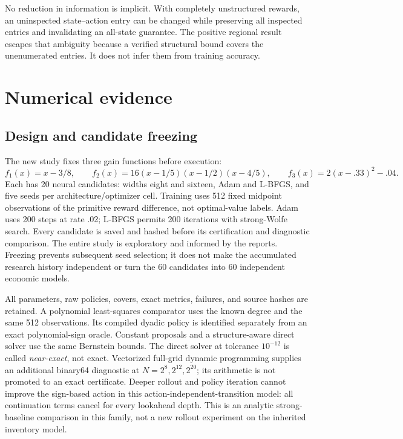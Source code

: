 No reduction in information is implicit. With completely unstructured rewards, an uninspected state--action entry can be changed while preserving all inspected entries and invalidating an all-state guarantee. The positive regional result escapes that ambiguity because a verified structural bound covers the unenumerated entries. It does not infer them from training accuracy.

\section{Numerical evidence}\label{sec:evidence30}
\subsection{Design and candidate freezing}
The new study fixes three gain functions before execution:
\begin{equation}
 f_1(x)=x-3/8,\qquad f_2(x)=16(x-1/5)(x-1/2)(x-4/5),\qquad
 f_3(x)=2(x-.33)^2-.04.
\end{equation}
Each has 20 neural candidates: widths eight and sixteen, Adam and L-BFGS, and five seeds per architecture/optimizer cell. Training uses 512 fixed midpoint observations of the primitive reward difference, not optimal-value labels. Adam uses 200 steps at rate .02; L-BFGS permits 200 iterations with strong-Wolfe search. Every candidate is saved and hashed before its certification and diagnostic comparison. The entire study is exploratory and informed by the reports. Freezing prevents subsequent seed selection; it does not make the accumulated research history independent or turn the 60 candidates into 60 independent economic models.

All parameters, raw policies, covers, exact metrics, failures, and source hashes are retained. A polynomial least-squares comparator uses the known degree and the same 512 observations. Its compiled dyadic policy is identified separately from an exact polynomial-sign oracle. Constant proposals and a structure-aware direct solver use the same Bernstein bounds. The direct solver at tolerance $10^{-12}$ is called \emph{near-exact}, not exact. Vectorized full-grid dynamic programming supplies an additional binary64 diagnostic at $N=2^8,2^{12},2^{20}$; its arithmetic is not promoted to an exact certificate. Deeper rollout and policy iteration cannot improve the sign-based action in this action-independent-transition model: all continuation terms cancel for every lookahead depth. This is an analytic strong-baseline comparison in this family, not a new rollout experiment on the inherited inventory model.

